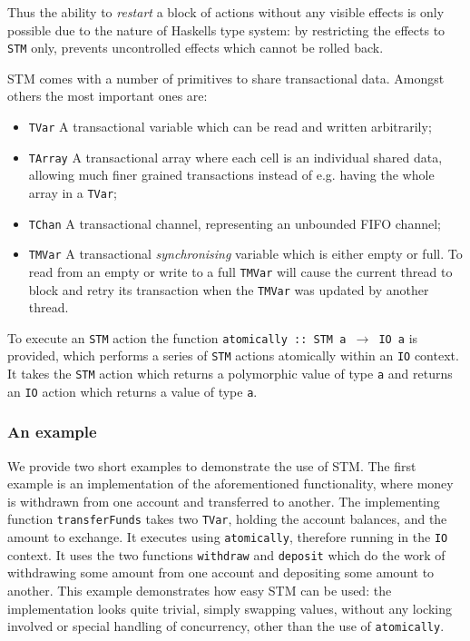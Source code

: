 Thus the ability to \textit{restart} a block of actions without any visible effects is only possible due to the nature of Haskells type system: by restricting the effects to \texttt{STM} only, prevents uncontrolled effects which cannot be rolled back.

STM comes with a number of primitives to share transactional data. Amongst others the most important ones are:

\begin{itemize}
	\item \texttt{TVar}   A transactional variable which can be read and written arbitrarily;
	\item \texttt{TArray}   A transactional array where each cell is an individual shared data, allowing much finer grained transactions instead of e.g. having the whole array in a \texttt{TVar};
	\item \texttt{TChan}   A transactional channel, representing an unbounded FIFO channel;
	\item \texttt{TMVar}   A transactional \textit{synchronising} variable which is either empty or full. To read from an empty or write to a full \texttt{TMVar} will cause the current thread to block and retry its transaction when the \texttt{TMVar} was updated by another thread.
\end{itemize}

To execute an \texttt{STM} action the function \texttt{atomically :: STM a $\to$ IO a} is provided, which performs a series of \texttt{STM} actions atomically within an \texttt{IO} context. It takes the \texttt{STM} action which returns a polymorphic value of type \texttt{a} and returns an \texttt{IO} action which returns a value of type \texttt{a}.

\subsubsection{An example}
\label{sub:stm_example}
We provide two short examples to demonstrate the use of STM. The first example is an implementation of the aforementioned functionality, where money is withdrawn from one account and transferred to another. The implementing function \texttt{transferFunds} takes two \texttt{TVar}, holding the account balances, and the amount to exchange. It executes using \texttt{atomically}, therefore running in the \texttt{IO} context. It uses the two functions \texttt{withdraw} and \texttt{deposit} which do the work of withdrawing some amount from one account and depositing some amount to another. This example demonstrates how easy STM can be used: the implementation looks quite trivial, simply swapping values, without any locking involved or special handling of concurrency, other than the use of \texttt{atomically}. \\ %

